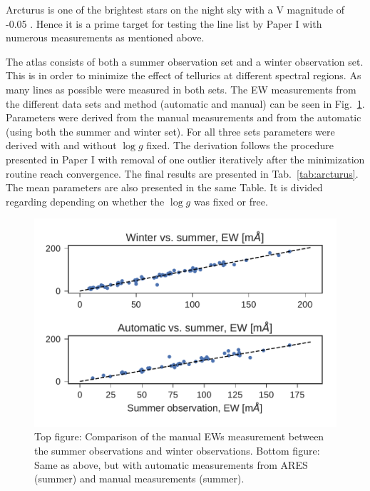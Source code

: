 \documentclass{aa}
\begin{document}
Arcturus is one of the brightest stars on the night sky with a V magnitude of
-0.05 \citep{Ducati2002}. Hence it is a prime target for testing the line list
by Paper I with numerous measurements as mentioned above.

The atlas consists of both a summer observation set and a winter observation
set. This is in order to minimize the effect of tellurics at different spectral
regions. As many lines as possible were measured in both sets. The EW
measurements from the different data sets and method (automatic and manual) can
be seen in Fig.~\ref{fig:EWcomp}. Parameters were derived from the manual
measurements and from the automatic (using both the summer and winter set). For
all three sets parameters were derived with and without $\log g$ fixed. The
derivation follows the procedure presented in Paper I with removal of one
outlier iteratively after the minimization routine \citep{Andreasen2017a} reach
convergence. The final results are presented in Tab.~\ref{tab:arcturus}. The
mean parameters are also presented in the same Table. It is divided regarding
depending on whether the $\log g$ was fixed or free.

\begin{figure}[tpb]
    \centering
    \includegraphics[width=1.0\linewidth]{figures/EWcomp.pdf}
    \caption{Top figure: Comparison of the manual EWs measurement between the
             summer observations and winter observations. Bottom figure: Same as
             above, but with automatic measurements from ARES (summer) and
             manual measurements (summer).}
    \label{fig:EWcomp}
\end{figure}
\end{document}
